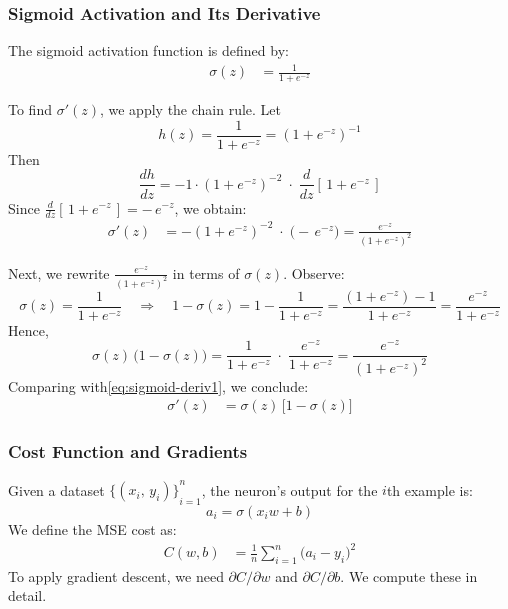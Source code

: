 \documentclass{article}
\begin{document}
\subsubsection{Sigmoid Activation and Its Derivative}\label{sec:one-neuron-sigmoid}

\noindent The sigmoid activation function is defined by:
\begin{align}
    \sigma(z) 
    &= \frac{1}{1 + e^{-z}}
    \label{eq:sigmoid-def}
\end{align}

\vspace{0.5em}
\noindent To find \(\sigma'(z)\), we apply the chain rule.  Let
\[
    h(z) = \frac{1}{1 + e^{-z}} = {(1 + e^{-z})}^{-1}
\]
Then
\[
    \frac{dh}{dz} 
    = -1 \cdot {(1 + e^{-z})}^{-2} \;\cdot\; \frac{d}{dz}[\,1 + e^{-z}\,]
\]
Since \(\frac{d}{dz}[\,1 + e^{-z}\,] = -\,e^{-z}\), we obtain:
\begin{align}
    \sigma'(z) 
    &= - {(1 + e^{-z})}^{-2} \;\cdot\; \bigl(-\,e^{-z}\bigr)
    = \frac{e^{-z}}{{(1 + e^{-z})}^2}
    \label{eq:sigmoid-deriv1}
\end{align}

\noindent Next, we rewrite \(\frac{e^{-z}}{{(1 + e^{-z})}^2}\) in terms of \(\sigma(z)\). Observe:
\[
    \sigma(z) = \frac{1}{1 + e^{-z}}
    \quad\Longrightarrow\quad
    1 - \sigma(z) = 1 - \frac{1}{1 + e^{-z}}
    = \frac{(1 + e^{-z}) - 1}{1 + e^{-z}}
    = \frac{e^{-z}}{1 + e^{-z}}
\]
Hence,
\[
    \sigma(z) \,\bigl(1 - \sigma(z)\bigr)
    = \frac{1}{1 + e^{-z}} \;\cdot\; \frac{e^{-z}}{1 + e^{-z}}
    = \frac{e^{-z}}{{(1 + e^{-z})}^2}
\]
Comparing with\eqref{eq:sigmoid-deriv1}, we conclude:
\begin{align}
    \sigma'(z) 
    &= \sigma(z)\,\bigl[1 - \sigma(z)\bigr]
    \label{eq:sigmoid-deriv2}
\end{align}

\subsubsection{Cost Function and Gradients}\label{sec:one-neuron-gradient}

\noindent Given a dataset \({\{(x_i,\,y_i)\}}_{i=1}^n\), the neuron's output for the \(i\)th example is:
\[
    a_i = \sigma(x_i w + b)
\]
We define the MSE cost as:
\begin{align}
    C(w, b)
    &= \frac{1}{n} \sum_{i=1}^{n} {\bigl(a_i - y_i\bigr)}^2
    \label{eq:one-neuron-cost}
\end{align}
To apply gradient descent, we need \(\partial C / \partial w\) and \(\partial C / \partial b\).  We compute these in detail.
\end{document}
